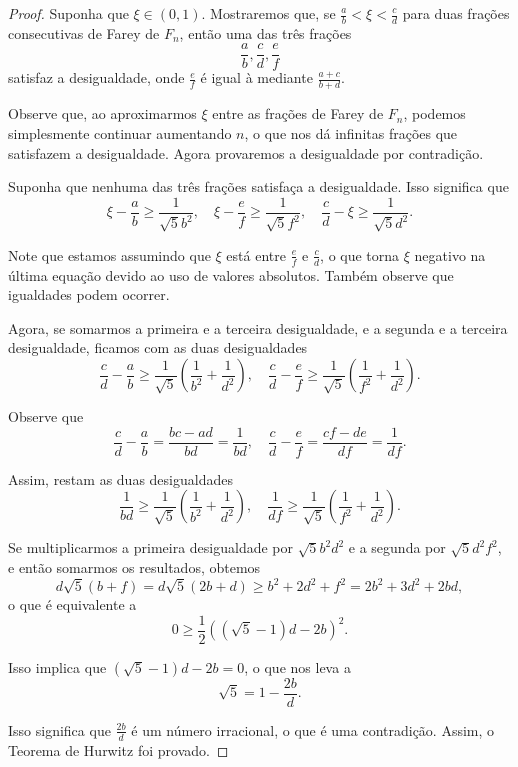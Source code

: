 \documentclass{hipatia}
\theoremstyle{definition} %
\begin{document}
\begin{proof}
Suponha que \(\xi \in (0,1)\). Mostraremos que, se \(\frac{a}{b} < \xi < \frac{c}{d}\) para duas frações consecutivas de Farey de \(F_n\), então uma das três frações
\[
\frac{a}{b}, \frac{c}{d}, \frac{e}{f}
\]
satisfaz a desigualdade, onde \(\frac{e}{f}\) é igual à mediante \(\frac{a+c}{b+d}\).

Observe que, ao aproximarmos \(\xi\) entre as frações de Farey de \(F_n\), podemos simplesmente continuar aumentando \(n\), o que nos dá infinitas frações que satisfazem a desigualdade. Agora provaremos a desigualdade por contradição.

Suponha que nenhuma das três frações satisfaça a desigualdade. Isso significa que
\[
\xi - \frac{a}{b} \geq \frac{1}{\sqrt{5}b^2}, \quad \xi - \frac{e}{f} \geq \frac{1}{\sqrt{5}f^2}, \quad \frac{c}{d} - \xi \geq \frac{1}{\sqrt{5}d^2}.
\]

Note que estamos assumindo que \(\xi\) está entre \(\frac{e}{f}\) e \(\frac{c}{d}\), o que torna \(\xi\) negativo na última equação devido ao uso de valores absolutos. Também observe que igualdades podem ocorrer.

Agora, se somarmos a primeira e a terceira desigualdade, e a segunda e a terceira desigualdade, ficamos com as duas desigualdades
\[
\frac{c}{d} - \frac{a}{b} \geq \frac{1}{\sqrt{5}} \left( \frac{1}{b^2} + \frac{1}{d^2} \right), \quad \frac{c}{d} - \frac{e}{f} \geq \frac{1}{\sqrt{5}} \left( \frac{1}{f^2} + \frac{1}{d^2} \right).
\]

Observe que
\[
\frac{c}{d} - \frac{a}{b} = \frac{bc - ad}{bd} = \frac{1}{bd}, \quad \frac{c}{d} - \frac{e}{f} = \frac{cf - de}{df} = \frac{1}{df}.
\]

Assim, restam as duas desigualdades
\[
\frac{1}{bd} \geq \frac{1}{\sqrt{5}} \left( \frac{1}{b^2} + \frac{1}{d^2} \right), \quad \frac{1}{df} \geq \frac{1}{\sqrt{5}} \left( \frac{1}{f^2} + \frac{1}{d^2} \right).
\]

Se multiplicarmos a primeira desigualdade por \(\sqrt{5}b^2d^2\) e a segunda por \(\sqrt{5}d^2f^2\), e então somarmos os resultados, obtemos
\[
d\sqrt{5}(b + f) = d\sqrt{5}(2b + d) \geq b^2 + 2d^2 + f^2 = 2b^2 + 3d^2 + 2bd,
\]
o que é equivalente a
\[
0 \geq \frac{1}{2} ((\sqrt{5} - 1)d - 2b)^2.
\]

Isso implica que \((\sqrt{5} - 1)d - 2b = 0\), o que nos leva a
\[
\sqrt{5} = 1 - \frac{2b}{d}.
\]

Isso significa que \(\frac{2b}{d}\) é um número irracional, o que é uma contradição. Assim, o Teorema de Hurwitz foi provado.
\end{proof}
\end{document}
